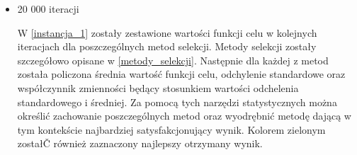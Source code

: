\begin{itemize}
\item 20 000 iteracji\\
\par
 W \ref{instancja_1} zostały zestawione wartości funkcji celu w kolejnych iteracjach dla poszczególnych metod selekcji. Metody selekcji zostały szczegółowo opisane w \ref{metody_selekcji}. Następnie dla każdej z metod została policzona średnia wartość funkcji celu, odchylenie standardowe oraz współczynnik zmienności będący stosunkiem wartości odchelenia standardowego i średniej. Za pomocą tych narzędzi statystycznych można określić zachowanie poszczególnych metod oraz wyodrębnić metodę dającą w tym kontekście najbardziej satysfakcjonujący wynik. Kolorem zielonym zostałČ również zaznaczony najlepszy otrzymany wynik.\\
\par
\begin{table}[h!]
\begin{center}
\end{center}
\end{table}
\end{itemize}
